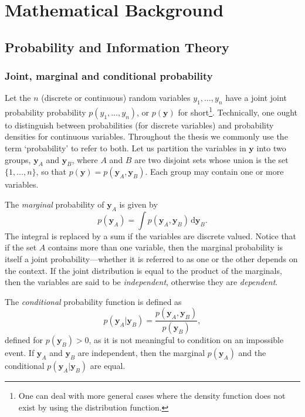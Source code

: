 \chapter{Mathematical Background}

\minitoc




\section{Probability and Information Theory}


\subsection{Joint, marginal and conditional probability}

Let the $n$ (discrete or continuous) random variables $y_1, \ldots, y_n$ have a joint joint probability probability $p(y_1, \ldots, y_n)$, or $p(\mathbf{y})$ for short\footnote{One can deal with more general cases where the density function does not exist by using the distribution function.}. Technically, one ought to distinguish between probabilities (for discrete variables) and probability densities for continuous variables. Throughout the thesis we commonly use the term `probability' to refer to both. Let us partition the variables in $\mathbf{y}$ into two groups, $\mathbf{y}_A$ and $\mathbf{y}_B$, where $A$ and $B$ are two disjoint sets whose union is the set $\{1, \ldots, n\}$, so that $p(\mathbf{y}) = p(\mathbf{y}_A, \mathbf{y}_B)$. Each group may contain one or more variables.

The \emph{marginal} probability of $\mathbf{y}_A$ is given by
\begin{equation}
	p(\mathbf{y}_A) = \int  p(\mathbf{y}_A, \mathbf{y}_B) \, \mathrm{d}\mathbf{y}_B.
\end{equation}
The integral is replaced by a sum if the variables are discrete valued. Notice that if the set $A$ contains more than one variable, then the marginal probability is itself a joint probability---whether it is referred to as one or the other depends on the context. If the joint distribution is equal to the product of the marginals, then the variables are said to be \emph{independent}, otherwise they are \emph{dependent}.

The \emph{conditional} probability function is defined as
\begin{equation}
	p(\mathbf{y}_A|\mathbf{y}_B) = \frac{p(\mathbf{y}_A, \mathbf{y}_B)}{p(\mathbf{y}_B)},
\end{equation}
defined for $p(\mathbf{y}_B) > 0$, as it is not meaningful to condition on an impossible event. If $\mathbf{y}_A$ and $\mathbf{y}_B$ are independent, then the marginal $p(\mathbf{y}_A)$ and the conditional $p(\mathbf{y}_A|\mathbf{y}_B)$ are equal.

